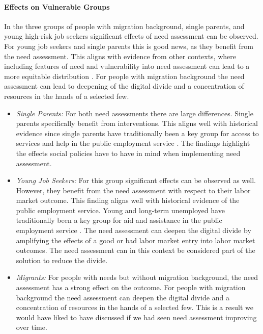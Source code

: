 \paragraph{Effects on Vulnerable Groups}
\label{sec:discussion_groups}
In the three groups of people with migration background, single parents, and young high-risk job seekers significant effects of need assessment can be observed. For young job seekers and single parents this is good news, as they benefit from the need assessment. This aligns with evidence from other contexts, where including features of need and vulnerability into need assessment can lead to a more equitable distribution \cite{chan2012,manski2004causal}. For people with migration background the need assessment can lead to deepening of the digital divide and a concentration of resources in the hands of a selected few.
\begin{itemize}
\item \emph{Single Parents:} For both need assessments there are large differences. Single parents specifically benefit from interventions. This aligns well with historical evidence since single parents have traditionally been a key group for access to services and help in the public employment service \cite{Kallus03042021}. The findings highlight the effects social policies have to have in mind when implementing need assessment. 
\item \emph{Young Job Seekers:} For this group significant effects can be observed as well. However, they benefit from the need assessment with respect to their labor market outcome. This finding aligns well with historical evidence of the public employment service. Young and long-term unemployed have traditionally been a key group for aid and assistance in the public employment service \cite{Kallus03042021}. The need assessment can deepen the digital divide by amplifying the effects of a good or bad labor market entry into labor market outcomes. The need assessment can in this context be considered part of the solution to reduce the divide.
\item \emph{Migrants:} For people with needs but without migration background, the need assessment has a strong effect on the outcome. For people with migration background the need assessment can deepen the digital divide and a concentration of resources in the hands of a selected few. This is a result we would have liked to have discussed if we had seen need assessment improving over time.
\end{itemize}

